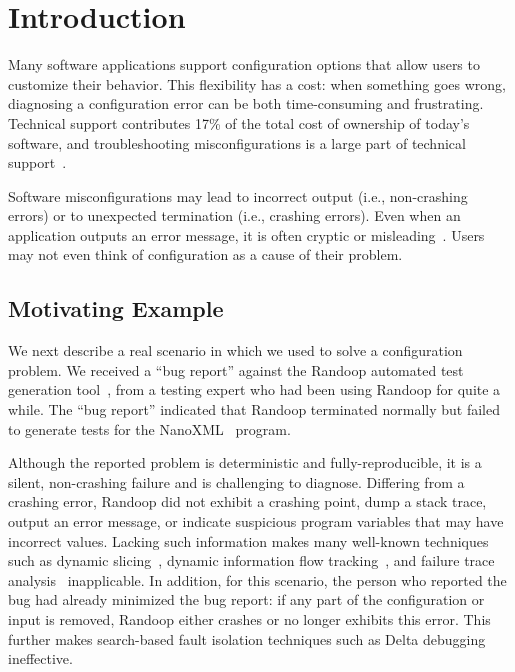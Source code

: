 
\section{Introduction}
\label{sec:introduction}

Many software applications support
configuration options that allow users to
customize their behavior. This flexibility has a cost: when something
goes wrong, diagnosing a configuration error can be both time-consuming
and frustrating. Technical support contributes 17\% of the total cost of ownership of
today's software, and troubleshooting misconfigurations
is a large part of technical support~\cite{confevidence}.

Software misconfigurations may lead to incorrect output (i.e., non-crashing
errors) or to unexpected termination
(i.e., crashing errors).  Even when an application outputs an error
message, it is often cryptic or misleading~\cite{Yin:2011:ESC, Attariyan:2010:ACT, Hubaux:2012, rangefix}.
Users may not even think of configuration as a cause of their problem.

\subsection{Motivating Example}
\label{sec:mot}

We next describe a real scenario in which we used \ourtool to solve a configuration problem. 
We received a ``bug report'' against the Randoop
automated test generation tool~\cite{PachecoLET2007},
from a testing expert who had been using Randoop for quite a while.
The ``bug report'' indicated that Randoop terminated normally but
failed to generate tests for the NanoXML~\cite{nanoxml} program. 

Although the reported problem is deterministic and fully-reproducible,
it is a silent, non-crashing failure and is
challenging to diagnose. Differing from
a crashing error, Randoop did not exhibit a crashing point, dump
 a stack trace, output an error message, or indicate suspicious program
variables that may have incorrect values. Lacking such information
makes many well-known
techniques such as dynamic slicing~\cite{Zhang:2003:PDS},
dynamic information flow tracking~\cite{Attariyan:2010:ACT}, and
failure trace analysis~\cite{Rabkin:2011:PPC} inapplicable.
In addition, for this scenario, the person who reported the bug had already
minimized the bug report:  if any part of the 
configuration or input is removed, Randoop either crashes or
no longer exhibits this error.
This further makes 
search-based fault isolation techniques such as Delta debugging~\cite{Zeller:2002:ICC}
ineffective.

